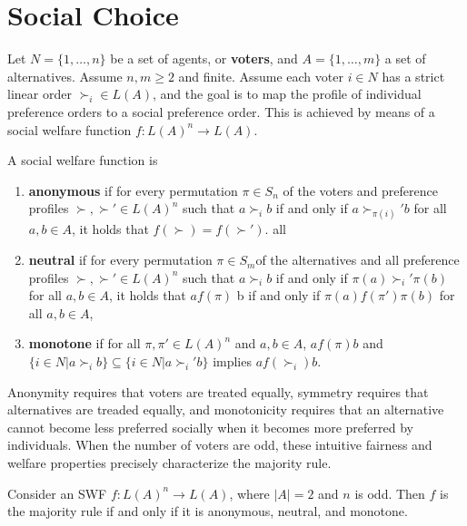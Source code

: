 \section{Social Choice}
\label{sec:social-choice}

\begin{defn}
  \label{sec:social-choice-1}
  Let $N = \{ 1, \dots, n \} $ be a set of agents, or \textbf{voters},
  and $A = \{ 1, \dots, m \} $ a set of alternatives. Assume $n, m
  \geq 2$ and finite. Assume each voter $i \in N$ has a strict linear
  order $\succ_{i} \in L(A)$, and the goal is to map the profile of
  individual preference orders to a social preference order. This is
  achieved by means of a social welfare function $f: L(A)^{n}
  \rightarrow L(A)$.

  A social welfare function is
  \begin{enumerate}
  \item \textbf{anonymous} if for every permutation $\pi \in S_{n}$ of
    the voters and preference profiles $\succ, \succ' \in L(A)^{n}$
    such that $a \succ_{i} b$ if and only if $a \succ_{\pi(i)}' b$ for
    all $a, b \in A$, it holds that $f(\succ) = f(\succ')$.
    all
  \item \textbf{neutral} if for every permutation $\pi \in S_{m}$of
    the alternatives and all preference profiles $\succ, \succ' \in
    L(A)^{n}$ such that $a \succ_{i} b $ if and only if
    $\pi(a)\succ_{i}' \pi(b)$ for all $a, b \in A$, it holds that $a
    f(\pi)$ b if and only if $\pi(a) f(\pi') \pi(b)$ for all $a, b \in
    A$,
  \item \textbf{monotone} if for all $\pi, \pi' \in L(A)^{n}$ and $a,
    b \in A$, $a f(\pi) b $ and $\{ i \in N | a \succ_{i} b \}
    \subseteq \{ i \in N | a \succ_{i}' b \}$ implies $a f(\succ_{i}) b$.
  \end{enumerate}
\end{defn}

  Anonymity requires that voters are treated equally, symmetry
requires that alternatives are treaded equally, and monotonicity
requires that an alternative cannot become less preferred socially
when it becomes more preferred by individuals. When the number of
voters are odd, these intuitive fairness and welfare properties
precisely characterize the majority rule.

\begin{thm}
  \label{sec:social-choice-3}
  Consider an SWF $f: L(A)^{n} \rightarrow L(A)$, where $|A| = 2$ and
  $n$ is odd.  Then $f$ is the majority rule if and only if it is
  anonymous, neutral, and monotone.
\end{thm}

